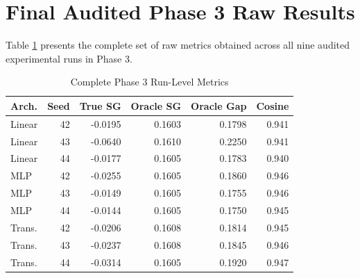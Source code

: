 \documentclass[conference]{IEEEtran}
\begin{document}
\appendix
\section*{Final Audited Phase 3 Raw Results}
Table \ref{tab:raw_results_app} presents the complete set of raw metrics obtained across all nine audited experimental runs in Phase 3. 
\begin{table}[h]
\centering
\caption{Complete Phase 3 Run-Level Metrics}
\label{tab:raw_results_app}
\begin{tabular}{lrrrrr}
\toprule
Arch. & Seed & True SG & Oracle SG & Oracle Gap & Cosine \\
\midrule
Linear & 42 & -0.0195 & 0.1603 & 0.1798 & 0.941 \\
Linear & 43 & -0.0640 & 0.1610 & 0.2250 & 0.941 \\
Linear & 44 & -0.0177 & 0.1605 & 0.1783 & 0.940 \\
MLP & 42 & -0.0255 & 0.1605 & 0.1860 & 0.946 \\
MLP & 43 & -0.0149 & 0.1605 & 0.1755 & 0.946 \\
MLP & 44 & -0.0144 & 0.1605 & 0.1750 & 0.945 \\
Trans. & 42 & -0.0206 & 0.1608 & 0.1814 & 0.945 \\
Trans. & 43 & -0.0237 & 0.1608 & 0.1845 & 0.946 \\
Trans. & 44 & -0.0314 & 0.1605 & 0.1920 & 0.947 \\
\bottomrule
\end{tabular}
\end{table}
\end{document}
